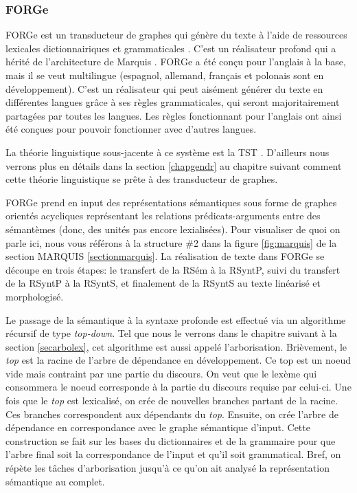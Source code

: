 \subsubsection{FORGe}
FORGe est un transducteur de graphes qui génère du texte à l'aide de ressources lexicales dictionnairiques et grammaticales \citep{MilledemoFORGePompeu2017,DBLP:conf/semeval/MilleCBW17}. C'est un réalisateur profond qui a hérité de l'architecture de Marquis \citep{WannerMARQUISGENERATIONUSERTAILORED2010}. FORGe a été conçu pour l'anglais à la base, mais il se veut multilingue (espagnol, allemand, français et polonais sont en développement). C'est un réalisateur qui peut aisément générer du texte en différentes langues grâce à ses règles grammaticales, qui seront majoritairement partagées par toutes les langues. Les règles fonctionnant pour l'anglais ont ainsi été conçues pour pouvoir fonctionner avec d'autres langues.

La théorie linguistique sous-jacente à ce système est la \ac{TST} \citep{melcuk1988,MelcukSemanticsmeaningtext2012}. D'ailleurs nous verrons plus en détails dans la section \ref{chapgendr} au chapitre suivant comment cette théorie linguistique se prête à des transducteur de graphes.

FORGe prend en input des représentations sémantiques sous forme de graphes orientés acycliques représentant les relations prédicats-arguments entre des sémantèmes (donc, des unités pas encore lexialisées). Pour visualiser de quoi on parle ici, nous vous référons à la structure \#2 dans la figure \ref{fig:marquis} de la section MARQUIS \ref{sectionmarquis}. La réalisation de texte dans FORGe se découpe en trois étapes: le transfert de la RSém à la RSyntP, suivi du transfert de la RSyntP à la RSyntS, et finalement de la RSyntS au texte linéarisé et morphologisé. 

Le passage de la sémantique à la syntaxe profonde est effectué via un algorithme récursif de type \emph{top-down}. Tel que nous le verrons dans le chapitre suivant à la section \ref{secarbolex}, cet algorithme est aussi appelé l'arborisation. Brièvement, le \emph{top} est la racine de l'arbre de dépendance en développement. Ce top est un noeud vide mais contraint par une partie du discours. On veut que le lexème qui consommera le noeud corresponde à la partie du discours requise par celui-ci. Une fois que le \emph{top} est lexicalisé, on crée de nouvelles branches partant de la racine. Ces branches correspondent aux dépendants du \emph{top}. Ensuite, on crée l'arbre de dépendance en correspondance avec le graphe sémantique d'input. Cette construction se fait sur les bases du dictionnaires et de la grammaire pour que l'arbre final soit la correspondance de l'input et qu'il soit grammatical. Bref, on répète les tâches d'arborisation jusqu'à ce qu'on ait analysé la représentation sémantique au complet.

